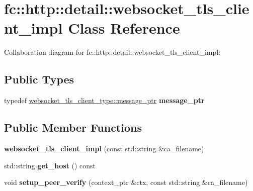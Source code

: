 \hypertarget{classfc_1_1http_1_1detail_1_1websocket__tls__client__impl}{}\section{fc\+:\+:http\+:\+:detail\+:\+:websocket\+\_\+tls\+\_\+client\+\_\+impl Class Reference}
\label{classfc_1_1http_1_1detail_1_1websocket__tls__client__impl}


Collaboration diagram for fc\+:\+:http\+:\+:detail\+:\+:websocket\+\_\+tls\+\_\+client\+\_\+impl\+:
\subsection*{Public Types}
\begin{DoxyCompactItemize}
\item 
\mbox{\label{classfc_1_1http_1_1detail_1_1websocket__tls__client__impl_a92cd9944cd061141200d108b6020ab8e}} 
typedef \mbox{\hyperlink{classwebsocketpp_1_1endpoint_a585ecbbfd9689d4e4229e4c8378bd672}{websocket\+\_\+tls\+\_\+client\+\_\+type\+::message\+\_\+ptr}} {\bfseries message\+\_\+ptr}
\end{DoxyCompactItemize}
\subsection*{Public Member Functions}
\begin{DoxyCompactItemize}
\item 
\mbox{\label{classfc_1_1http_1_1detail_1_1websocket__tls__client__impl_aed4c72d05f0dfd750f76516211579ba6}} 
{\bfseries websocket\+\_\+tls\+\_\+client\+\_\+impl} (const std\+::string \&ca\+\_\+filename)
\item 
\mbox{\label{classfc_1_1http_1_1detail_1_1websocket__tls__client__impl_ad396019c14bb8d6882fb30c72bdf9112}} 
std\+::string {\bfseries get\+\_\+host} () const
\item 
\mbox{\label{classfc_1_1http_1_1detail_1_1websocket__tls__client__impl_a9806cd2fbdbab221a844eab524c533a5}} 
void {\bfseries setup\+\_\+peer\+\_\+verify} (context\+\_\+ptr \&ctx, const std\+::string \&ca\+\_\+filename)
\end{DoxyCompactItemize}
